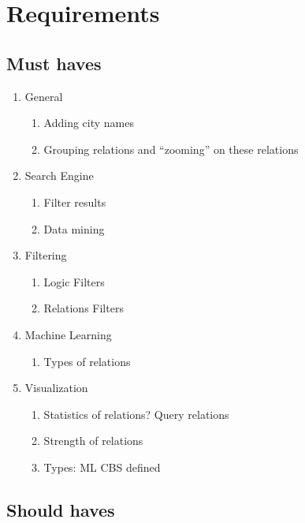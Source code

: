 \section {Requirements}

\subsection {Must haves}

\begin{enumerate}
    \item{General} 
    \begin{enumerate}
        \item Adding city names
        \item Grouping relations and “zooming” on these relations
    \end{enumerate}
    
    \item{Search Engine} 
    \begin{enumerate}
        \item Filter results
        \item Data mining
    \end{enumerate}
    
    \item{Filtering} 
    \begin{enumerate}
        \item Logic Filters 
        \item Relations Filters
    \end{enumerate}
    
    \item{Machine Learning} 
    \begin{enumerate}
        \item Types of relations
    \end{enumerate}
    
    \item{Visualization}
    \begin{enumerate}
        \item Statistics of relations? Query relations
        \item Strength of relations
        \item Types: ML CBS defined
    \end{enumerate}
\end{enumerate}


\subsection {Should haves}

